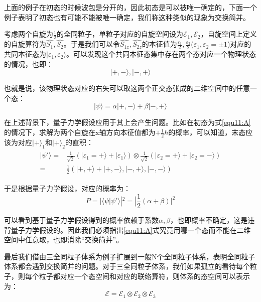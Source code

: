 上面的例子在初态的时候波包是分开的，因此初态是可以被唯一确定的，下面一个例子表明了初态也有可能不能被唯一确定，我们称这种类似的现象为交换简并。

考虑两个自旋为$\frac{1}{2}$的全同粒子，单粒子对应的自旋空间设为$\mathscr{E}_1,\mathscr{E}_2$，自旋空间上定义的自旋算符为$\hat{S_1},\hat{S_2}$。于是我们可以令$\hat{S_{1z}},\hat{S_{2z}}$的本征值为$\frac{\varepsilon_1}{2},\frac{\varepsilon_2}{2}$($\varepsilon_1,\varepsilon_2=\pm 1$)对应的共同本征态为$|\varepsilon_1,\varepsilon_2\rangle$。可以发现这个共同本征态集中存在两个态对应一个物理状态的情况，也即：
\begin{equation}
    |+,-\rangle,|-,+\rangle
\end{equation}

也就是说，该物理状态对应的右矢可以取这两个正交态张成的二维空间中的任意一个态：
\begin{equation}\label{equ11:A}
    |\psi\rangle=\alpha|+,-\rangle+\beta|-,+\rangle
\end{equation}

在上述背景下，量子力学假设应用于其上会产生问题。比如在初态为式\eqref{equ11:A}的情况下，求解为两个自旋在x轴方向本征值都为$+\frac{1}{2}\hbar$的概率，可以知道，末态应该为对应$|+\rangle_1$和$|+\rangle_2$的直积：
\begin{align}
    \begin{split}
        |\psi'\rangle=&\frac{1}{\sqrt{2}}(|\varepsilon_1=+\rangle+|\varepsilon_1\rangle)\otimes \frac{1}{\sqrt{2}}(|\varepsilon_2=+\rangle+|\varepsilon_2=-\rangle) \\
        =&\frac{1}{2}(|+,+\rangle+|+,-\rangle,|-,+\rangle,|-,-\rangle)
    \end{split}
\end{align}

于是根据量子力学假设，对应的概率为：
\begin{equation}
    P=|\langle \psi|\psi'\rangle|^2=|\frac{1}{2}(\alpha+\beta)|^2
\end{equation}

可以看到基于量子力学假设得到的概率依赖于系数$\alpha,\beta$，也即概率不确定，这是违背量子力学假设的。因此我们必须指出\eqref{equ11:A}式究竟用哪一个态而不能在二维空间中任意取，也即消除“交换简并”。

最后我们借由三全同粒子体系为例子扩展到一般N个全同粒子体系，表明全同粒子体系都会遇到交换简并的问题。对于三全同粒子体系，我们如果孤立的看待每个粒子，则每个粒子都对应一个态空间和对应的联络算符，则体系的态空间可以表示为：
\begin{equation}
    \mathscr{E}=\mathscr{E}_1\otimes\mathscr{E}_2\otimes\mathscr{E}_3
\end{equation}

